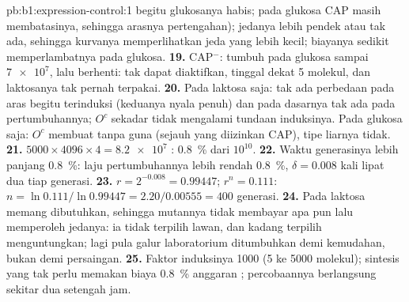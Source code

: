 \begin{solution}{pb:b1:expression-control:1}
begitu glukosanya habis; pada glukosa CAP masih membatasinya, sehingga
arasnya pertengahan); jedanya lebih pendek atau tak ada, sehingga
kurvanya memperlihatkan jeda yang lebih kecil; biayanya sedikit
memperlambatnya pada glukosa.
\textbf{19.} CAP$^-$: tumbuh pada glukosa sampai $\num{7e7}$, lalu
berhenti:  tak dapat diaktifkan,  tinggal dekat 5
molekul, dan laktosanya tak pernah terpakai.
\textbf{20.} Pada laktosa saja: tak ada perbedaan pada aras 
begitu terinduksi (keduanya nyala penuh) dan pada dasarnya tak ada pada
pertumbuhannya; $O^c$ sekadar tidak mengalami tundaan induksinya. Pada
glukosa saja: $O^c$ membuat  tanpa guna (sejauh yang diizinkan
CAP), tipe liarnya tidak.
\textbf{21.} $5000\times 4096\times 4 = \num{8.2e7}$ : \qty{0.8}{\%}
dari $10^{10}$.
\textbf{22.} Waktu generasinya lebih panjang \qty{0.8}{\%}: laju
pertumbuhannya lebih rendah \qty{0.8}{\%}, $\delta = 0.008$ kali lipat
dua tiap generasi.
\textbf{23.} $r = 2^{-0.008} = 0.99447$; $r^n = 0.111$: $n =
\ln 0.111/\ln 0.99447 = 2.20/0.00555 = 400$ generasi.
\textbf{24.} Pada laktosa  memang dibutuhkan, sehingga mutannya
tidak membayar apa pun lalu memperoleh jedanya: ia tidak terpilih
lawan, dan kadang terpilih menguntungkan; lagi pula galur laboratorium
ditumbuhkan demi kemudahan, bukan demi persaingan.
\textbf{25.} Faktor induksinya 1000 (5 ke \num{5000} molekul);
sintesis yang tak perlu memakan biaya \qty{0.8}{\%} anggaran ;
percobaannya berlangsung sekitar dua setengah jam.
\end{solution}
